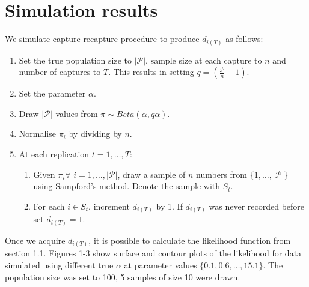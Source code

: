 \documentclass[a4paper, 12pt]{article}
\begin{document}
\section{Simulation results}
We simulate capture-recapture procedure to produce $d_{i(T)}$ as follows:
\begin{enumerate}
    \item Set the true population size to $|\mathcal{P}|$, sample size at each capture to $n$ and number of captures to $T$. This results in setting $q = (\frac{\mathcal{P}}{n} - 1)$. 
    \item Set the parameter $\alpha$.
    \item Draw $|\mathcal{P}|$ values from $\pi \sim Beta(\alpha, q\alpha)$.
    \item Normalise $\pi_i$ by dividing by $n$.
    \item At each replication $t = 1,\dots,T$:
        \begin{enumerate}
            \item Given $\pi_i \forall$ $i = 1,\dots,|\mathcal{P}|$, draw a sample of $n$ numbers from $\{1,\dots,|\mathcal{P}|\}$ using Sampford's method. Denote the sample with $S_t$.
            \item For each $i \in S_t$, increment $d_{i(T)}$ by 1. If $d_{i(T)}$ was never recorded before set $d_{i(T)} = 1$.
        \end{enumerate}
\end{enumerate}
Once we acquire $d_{i(T)}$, it is possible to calculate the likelihood function from section 1.1. Figures 1-3 show surface and contour plots of the likelihood for data simulated using different true $\alpha$ at parameter values $\{0.1, 0.6, \dots, 15.1\}$. The population size was set to 100, 5 samples of size 10 were drawn.
\end{document}
